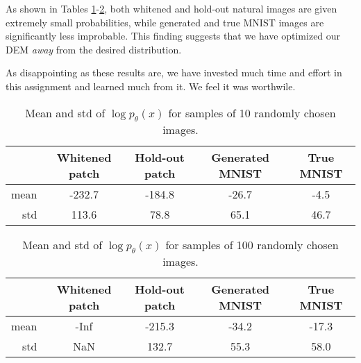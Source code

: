 \documentclass[a4paper]{article}
\theoremstyle{definition}
\theoremstyle{plain}
\begin{document}
As shown in Tables \ref{table1}-\ref{table2}, both whitened and hold-out natural images are given extremely small probabilities, while generated and true MNIST images are significantly less improbable. This finding suggests that we have optimized our DEM \emph{away} from the desired distribution.

As disappointing as these results are, we have invested much time and effort in this assignment and learned much from it. We feel it was worthwile.

\vspace{7mm}

\begin{table}[H]
\centering
\begin{tabular}{r | c | c | c | c |}
& Whitened patch & Hold-out patch & Generated MNIST & True MNIST\\
\hline
mean & -232.7 & -184.8 & -26.7 & -4.5\\
\hline
std & 113.6 & 78.8 & 65.1 & 46.7\\
\hline
\end{tabular}
\caption{Mean and std of $\log p_\theta(x)$ for samples of 10 randomly chosen images.}
\label{table1}
\end{table}

\begin{table}[H]
\centering
\begin{tabular}{r | c | c | c | c |}
& Whitened patch & Hold-out patch & Generated MNIST & True MNIST\\
\hline
mean &-Inf& -215.3 & -34.2 & -17.3\\
\hline
std & NaN & 132.7 & 55.3 & 58.0\\
\hline
\end{tabular}
\caption{Mean and std of $\log p_\theta(x)$ for samples of 100 randomly chosen images.}
\label{table2}
\end{table}
\end{document}
